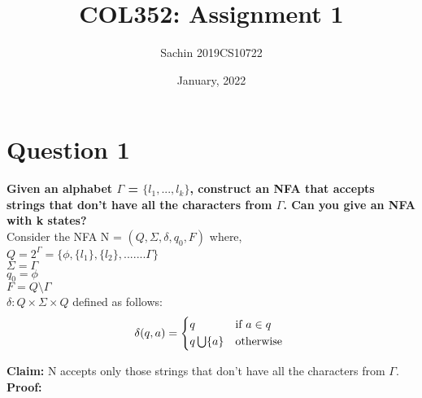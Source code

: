 \documentclass{article}
\title{COL352: Assignment 1}
\author{Sachin 2019CS10722 }
\date{January, 2022}
\begin{document}
\maketitle

\section{Question 1}

\textbf{Given an alphabet $\Gamma $ = $\{l_1,...,l_k\}$, construct an NFA that accepts strings that don't have
all the characters from $\Gamma $. Can you give an NFA with k states?}\\

Consider the NFA N = {$(Q, \Sigma, \delta, q_0 , F )$} where,\\
$Q = 2^\Gamma = \{\phi, \{l_1\}, \{l_2\}, ....... \Gamma\}$\\
$\Sigma = \Gamma$\\
$q_0 = \phi$\\
$F = Q \setminus  \Gamma$\\
$\delta: Q \times \Sigma \times Q$ defined as follows:\\

\begin{equation}
    \delta (q,a) = 
    \begin{cases*}
      q & if $a \in q$ \\
      q \bigcup \{a\}        & otherwise
    \end{cases*}
  \end{equation}

\textbf{Claim: } N accepts only those strings that don't have all the characters from $\Gamma $.\\

\textbf{Proof: } \\
\end{document}
